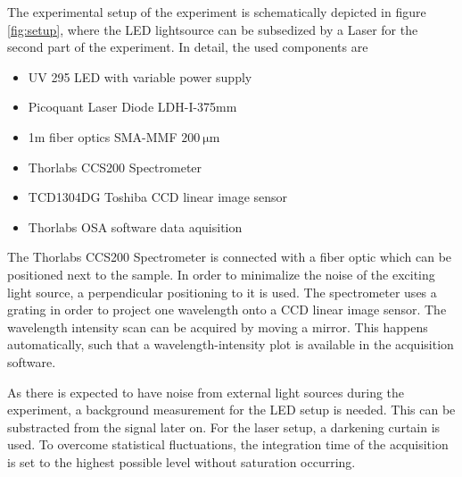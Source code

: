 The experimental setup of the experiment is schematically depicted in figure \ref{fig:setup}, where the LED lightsource can be subsedized by a Laser for the second part of the experiment.
In detail, the used components are 
\begin{itemize}
    \item UV 295 LED with variable power supply
    \item Picoquant Laser Diode LDH-I-375mm
    \item 1m fiber optics SMA-MMF $\SI{200}{\micro\meter}$
    \item Thorlabs CCS200 Spectrometer
    \item TCD1304DG Toshiba CCD linear image sensor
    \item Thorlabs OSA software data aquisition
\end{itemize}

The Thorlabs CCS200 Spectrometer is connected with a fiber optic which can be positioned next to the sample. 
In order to minimalize the noise of the exciting light source, a perpendicular positioning to it is used.
The spectrometer uses a grating in order to project one wavelength onto a CCD linear image sensor.
The wavelength intensity scan can be acquired by moving a mirror. This happens automatically, such that a wavelength-intensity plot is available in the acquisition software.

As there is expected to have noise from external light sources during the experiment, a background measurement for the LED setup is needed.
This can be substracted from the signal later on.
For the laser setup, a darkening curtain is used. 
To overcome statistical fluctuations, the integration time of the acquisition is set to the highest possible level without saturation occurring.
